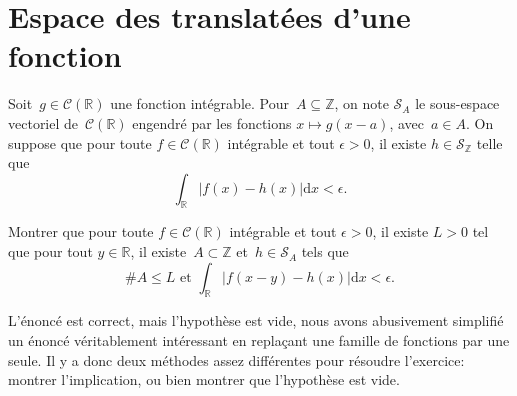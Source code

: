\section{Espace des translatées d'une fonction}
\label{sec:espace-des-transl}


Soit~$g \in \mathcal{C}(\mathbb{R})$ une fonction intégrable.
Pour~$A\subseteq \mathbb{Z}$, on note $\mathcal{S}_A$ le sous-espace vectoriel de~$\mathcal{C}(\mathbb{R})$ engendré par les fonctions $x\mapsto g(x-a)$, avec~$a\in A$.
On suppose que pour toute $f \in \mathcal{C}(\mathbb{R})$ intégrable et tout $\epsilon > 0$, il existe $h \in \mathcal{S}_\mathbb{Z}$ telle que
\[ \int_\mathbb{R} |f(x)-h(x)| \mathrm{d}x<\epsilon. \]

Montrer que pour toute $f\in \mathcal{C}(\mathbb{R})$ intégrable et tout $\epsilon >0$, il existe $L>0$ tel que
pour tout $y \in \mathbb{R}$, il existe~$A \subset \mathbb{Z}$ et~$h\in \mathcal{S}_A$ tels que
\[ \# A \leq L \text{ et } \int_\mathbb{R} |f(x-y)-h(x)|\mathrm{d} x< \epsilon. \]

\begin{em}
  L'énoncé est correct, mais l'hypothèse est vide, nous avons abusivement simplifié un énoncé véritablement intéressant en replaçant une famille de fonctions par une seule. Il y a donc deux méthodes assez différentes pour résoudre l'exercice: montrer l'implication, ou bien montrer que l'hypothèse est vide.
\end{em}

